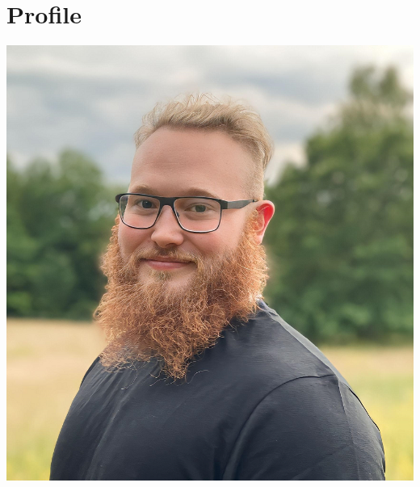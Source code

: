 \documentclass{article}
\begin{document}
	\noindent
	\begin{minipage}[t]{0.7\textwidth}
		\vspace{-20pt} %
		\section*{\textcolor{colorBlue}{Profile}}
        
		
	\end{minipage}%
	\hfill
	\begin{minipage}[t]{0.28\textwidth}
		\begin{minipage}[t]{0.8\textwidth}
			\vspace{-10pt} %
			\includegraphics[width=\linewidth]{../../../me-s.png}
			\label{fig:image}
		\end{minipage}
		
	\end{minipage}
	
\end{document}
